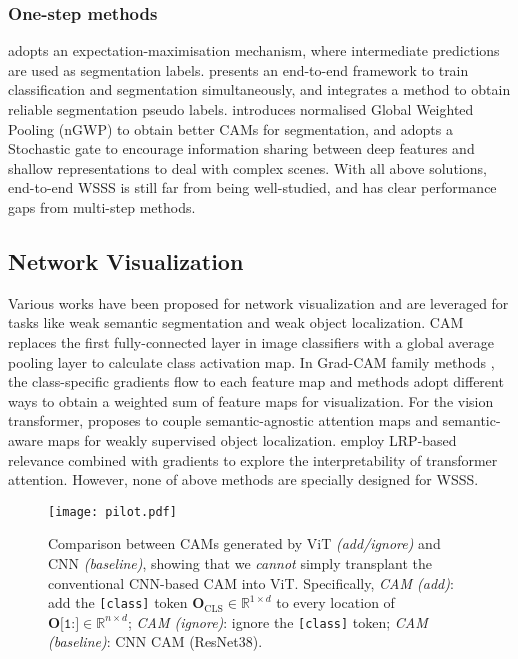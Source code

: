 \documentclass[10pt,twocolumn,letterpaper]{article}
\begin{document}
\subsubsection{One-step methods}
\cite{papandreou2015weakly} adopts an expectation-maximisation mechanism, where intermediate predictions are used as segmentation labels.
\cite{zhang2020reliability} presents an
end-to-end framework to train classification and segmentation simultaneously, and integrates a method to obtain reliable segmentation pseudo labels.
\cite{Araslanov_2020_CVPR} introduces normalised Global Weighted Pooling (nGWP) to obtain better CAMs for segmentation, and adopts a Stochastic gate to encourage information sharing between deep features and shallow representations to deal with complex scenes.
With all above solutions, end-to-end WSSS is still far from being well-studied, and has clear performance gaps from multi-step methods. 


\subsection{Network Visualization}
Various works have been proposed for network visualization and are leveraged for tasks like weak semantic segmentation and weak object localization.
CAM \cite{zhou2016learning} replaces the first fully-connected layer in image classifiers with a global average pooling layer to calculate class activation map.
In Grad-CAM family methods \cite{selvaraju2016grad,jiang2021layercam,chattopadhay2018grad}, the class-specific gradients flow to each feature map and methods adopt different ways to obtain a weighted sum of feature maps for visualization.
For the vision transformer, \cite{gao2021tscam} proposes to couple semantic-agnostic attention maps and semantic-aware maps for weakly supervised object localization.
\cite{chefer2021transformer,chefer2021generic} employ LRP-based relevance \cite{bach2015pixel} combined with gradients to explore the interpretability of transformer attention. However, none of above methods are specially designed for WSSS.



\begin{figure}[!t]
   \begin{center}
   {\texttt{[image: pilot.pdf]}} 
   \end{center}
    \caption{Comparison between CAMs generated by ViT \textit{(add/ignore)} and CNN \textit{(baseline)},
    showing that we \textit{cannot} simply transplant the conventional CNN-based CAM into ViT.
    Specifically,
    \textit{CAM (add)}: add the \texttt{[class]} token $\boldsymbol{O}_{\text{CLS}}\in\mathbb{R}^{1\times d}$ to every location of  $\boldsymbol{O}\texttt{[1:]}\in\mathbb{R}^{n\times d}$;
    \textit{CAM (ignore)}: ignore the \texttt{[class]} token; 
\textit{CAM (baseline)}: CNN CAM (ResNet38).
    }
\label{fig:pilot}
\end{figure}
\end{document}
